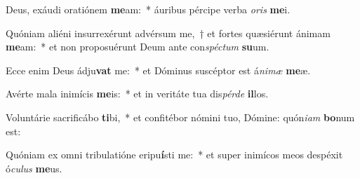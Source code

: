 \item Deus, exáudi oratiónem \textbf{me}am:~* áuribus pércipe verba \textit{oris} \textbf{me}i.
\item Quóniam aliéni insurrexérunt advérsum me,~† et fortes quæsiérunt ánimam \textbf{me}am:~* et non proposuérunt Deum ante con\hspace{0.03em}\textit{spéctum} \textbf{su}um.
\item Ecce enim Deus ádju\textbf{vat} me:~* et Dóminus suscéptor est á\textit{nimæ} \textbf{me}æ.
\item Avérte mala inimícis \textbf{me}is:~* et in veritáte tua dis\textit{pérde} \textbf{il}los.
\item Voluntárie sacrificábo \textbf{ti}bi,~* et confitébor nómini tuo, Dómine: quón\textit{iam} \textbf{bo}num est:
\item Quóniam ex omni tribulatióne eripu\textbf{í}sti me:~* et super inimícos meos despéxit ó\textit{culus} \textbf{me}us.
